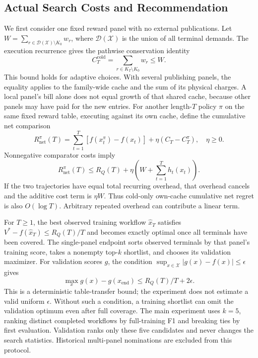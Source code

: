 \subsection{Actual Search Costs and Recommendation}
We first consider one fixed reward panel with no external publications.
Let $W=\sum_{r\in\mathcal D(\mathcal X)\setminus K_0}w_r$, where $\mathcal D(\mathcal X)$ is the union of all terminal demands. The execution recurrence gives the pathwise conservation identity
\begin{equation}
 C_T^{\mathrm{cold}}=\sum_{r\in K_T\setminus K_0}w_r\le W.
 \label{eq:conservation}
\end{equation}
This bound holds for adaptive choices. With several publishing panels, the
equality applies to the family-wide cache and the sum of its physical charges.
A local panel's bill alone does not equal growth of that shared cache, because
other panels may have paid for the new entries.
For another length-$T$ policy $\pi$ on the same fixed reward table, executing against its own cache, define the cumulative net comparison
\begin{equation}
 R_{\mathrm{net}}^\pi(T)=\sum_{t=1}^T[f(x_t^\pi)-f(x_t)]
             +\eta(C_T-C_T^\pi),\quad\eta\ge0.
 \label{eq:netregret}
\end{equation}
Nonnegative comparator costs imply
\begin{equation}
 R_{\mathrm{net}}^\pi(T)\le R_Q(T)+\eta\left(W+\sum_{t=1}^Th_t(x_t)\right).
 \label{eq:netbound}
\end{equation}
If the two trajectories have equal total recurring overhead, that overhead cancels and the additive cost term is $\eta W$. Thus cold-only own-cache cumulative net regret is also $O(\log T)$. Arbitrary repeated overhead can contribute a linear term.

For $T\ge1$, the best observed training workflow $\widehat x_T$ satisfies $V^*-f(\widehat x_T)\le R_Q(T)/T$ and becomes exactly optimal once all terminals have been covered. The single-panel endpoint sorts observed terminals by that panel's training score, takes a nonempty top-$k$ shortlist, and chooses its validation maximizer. For validation scores $g$, the condition $\sup_{x\in\mathcal X}|g(x)-f(x)|\le\epsilon$ gives
\begin{equation}
 \max_x g(x)-g(x_{\mathrm{end}})\le R_Q(T)/T+2\epsilon.
 \label{eq:validation}
\end{equation}
This is a deterministic table-transfer bound; the experiment does not estimate a valid uniform $\epsilon$. Without such a condition, a training shortlist can omit the validation optimum even after full coverage.
The main experiment uses $k=5$, ranking distinct completed workflows by full-training F1 and breaking ties by first evaluation. Validation ranks only these five candidates and never changes the search statistics. Historical multi-panel nominations are excluded from this protocol.

